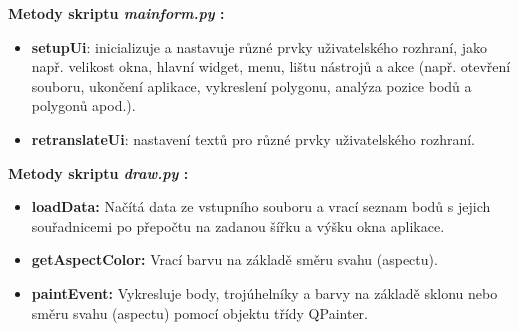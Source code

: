 \documentclass[a4paper,12pt]{article}
\begin{document}
{{{{{{{{{{{    \textbf{Metody skriptu \emph{mainform.py} :}
    \begin{itemize}
        \item \textbf{setupUi}: inicializuje a nastavuje různé prvky uživatelského rozhraní, jako např. velikost okna, hlavní widget, menu, lištu nástrojů a akce (např. otevření souboru, ukončení aplikace, vykreslení polygonu, analýza pozice bodů a polygonů apod.).
        
        \item \textbf{retranslateUi}: nastavení textů pro různé prvky uživatelského rozhraní.

        
    \end{itemize}

    \textbf{Metody skriptu \emph{draw.py} :}
    \begin{itemize}
    \item \textbf{loadData:} Načítá data ze vstupního souboru a vrací seznam bodů s jejich souřadnicemi po přepočtu na zadanou šířku a výšku okna aplikace.

    \item \textbf{getAspectColor:} Vrací barvu na základě směru svahu (aspectu).
    
    \item \textbf{paintEvent:} Vykresluje body, trojúhelníky a barvy na základě sklonu nebo směru svahu (aspectu) pomocí objektu třídy QPainter.
    \end{itemize}

}}}}}}}}}}}
\end{document}
